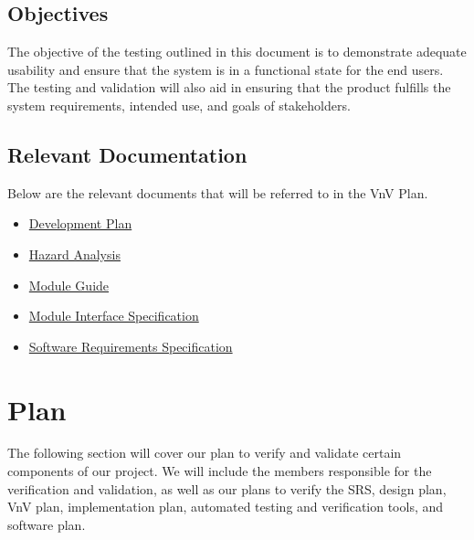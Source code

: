\documentclass[12pt, titlepage]{article}
\begin{document}
\subsection{Objectives}

The objective of the testing outlined in this document is to demonstrate adequate usability and
ensure that the system is in a functional state for the end users. The testing and validation will
also aid in ensuring that the product fulfills the system requirements, intended use, and goals of
stakeholders.

\subsection{Relevant Documentation}

Below are the relevant documents that will be referred to in the VnV Plan.

\begin{itemize}
	\item \href{https://github.com/arkinmodi/project-sayyara/blob/main/docs/DevelopmentPlan/DevelopmentPlan.pdf}{Development Plan \citep*{DevPlan}}
	\item \href{https://github.com/arkinmodi/project-sayyara/blob/main/docs/HazardAnalysis/HazardAnalysis.pdf}{Hazard Analysis \citep*{HA}}
	\item \href{https://github.com/arkinmodi/project-sayyara/blob/main/docs/Design/MG/MG.pdf}{Module Guide \citep*{MG}}
	\item \href{https://github.com/arkinmodi/project-sayyara/blob/main/docs/Design/MIS/MIS.pdf}{Module Interface Specification \citep*{MIS}}
	\item \href{https://github.com/arkinmodi/project-sayyara/blob/main/docs/SRS/SRS.pdf}{Software Requirements Specification \citep*{SRS}}
\end{itemize}


\section{Plan}

The following section will cover our plan to verify and validate certain components of our project.
We will include the members responsible for the verification and validation, as well as our plans
to verify the SRS, design plan, VnV plan, implementation plan, automated testing and verification
tools, and software plan.
\end{document}
